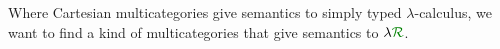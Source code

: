 Where Cartesian multicategories give semantics to simply typed
$\lambda$-calculus, we want to find a kind of multicategories that give
semantics to $\name$.
